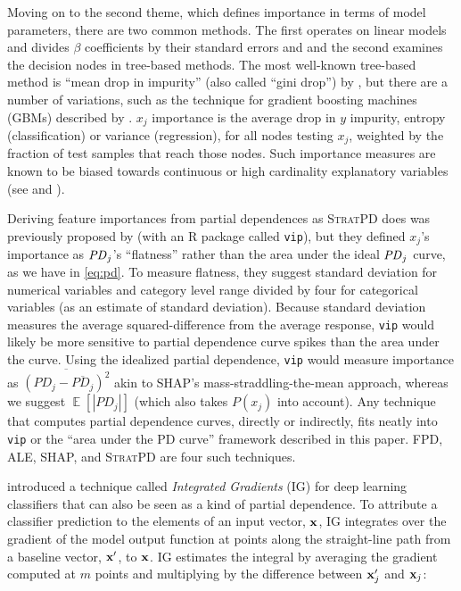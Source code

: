 \documentclass[11pt]{article}
\DeclareMathOperator{\Ex}{\mathbb{E}}
\newcommand{\spd}{\fontfamily{cmr}\textsc{\small StratPD}}
\begin{document}
Moving on to the second theme, which defines importance in terms of model parameters, there are two common methods. The first operates on linear models and divides $\beta$ coefficients by their standard errors and and the second examines the decision nodes in tree-based methods. The most well-known tree-based method is ``mean drop in impurity'' (also called ``gini drop'') by \cite{CART}, but there are a number of variations, such as the technique for gradient boosting machines (GBMs) described by \cite{PDP}. $x_j$ importance is the average drop in $y$ impurity, entropy (classification) or variance (regression), for all nodes testing $x_j$, weighted by the fraction of test samples that reach those nodes. Such importance measures are known to be biased towards continuous or high cardinality explanatory variables (see \citealt{permbias} and \citealt{RFunbiased}).

Deriving feature importances from partial dependences as \spd{} does was previously proposed by \cite{pdvim} (with an R package called {\tt vip}), but they defined $x_j$'s importance as ${\it PD}_j$'s ``flatness'' rather than the area under the ideal ${\it PD}_j$ curve, as we have in \eqref{eq:pd}. To measure flatness, they suggest standard deviation for numerical variables and category level range divided by four for categorical variables (as an estimate of standard deviation).  Because standard deviation measures the average squared-difference from the average response, {\tt vip} would likely be more sensitive to partial dependence curve spikes than the area under the curve.  Using the idealized partial dependence, {\tt vip} would measure importance as $\overline{(PD_j - \overline{PD_j})^2}$ akin to SHAP's mass-straddling-the-mean approach, whereas we suggest $\Ex[|PD_j|]$ (which also takes $P(x_j)$ into account).  Any technique that computes partial dependence curves, directly or indirectly, fits neatly into {\tt vip} or the ``area under the PD curve'' framework described in this paper. FPD, ALE, SHAP, and \spd{} are four such techniques.

\citet{intgrad} introduced a technique called {\em Integrated Gradients} (IG) for deep learning classifiers that can also be seen as a kind of partial dependence. To attribute a classifier prediction to the elements of an input vector, $\bf x$, IG integrates over the gradient of the model output function at points along the straight-line path from a baseline vector, $\bf x'$, to $\bf x$. IG estimates the integral by averaging the gradient computed at $m$ points and multiplying by the difference between ${\bf x}'_j$ and ${\bf x}_j$:
\end{document}
